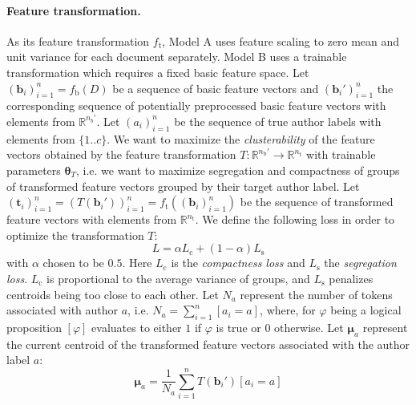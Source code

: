\documentclass[10pt, a4paper]{article}
\newcommand{\vect}[1]{\bm{#1}}
\begin{document}
\paragraph{Feature transformation.}
As its feature transformation $f_\mathrm{t}$, Model A uses feature scaling to zero mean and unit variance for each document separately. Model B uses a trainable transformation which requires a fixed basic feature space. Let $(\vect{b}_i)_{i=1}^n = f_\mathrm{b}(D)$ be a sequence of basic feature vectors and $(\vect{b}_i')_{i=1}^n$ the corresponding sequence of potentially preprocessed basic feature vectors with elements from $\mathbb{R}^{n_{b}'}$. Let $(a_i)_{i=1}^n$ be the sequence of true author labels with elements from $\{1..c\}$. We want to maximize the \emph{clusterability} of the feature vectors obtained by the feature transformation $T:\mathbb{R}^{n_\mathrm{b}'}\rightarrow\mathbb{R}^{n_\mathrm{t}}$ with trainable parameters $\vect{\theta}_T$, i.e. we want to maximize segregation and compactness of groups of transformed feature vectors grouped by their target author label. Let $(\vect{t}_i)_{i=1}^n = (T(\boldsymbol{b}_i'))_{i=1}^n = f_\mathrm{t}((\vect{b}_i)_{i=1}^n)$ be the sequence of transformed feature vectors with elements from $\mathbb{R}^{n_\mathrm{t}}$. We define the following loss in order to optimize the transformation $T$:
\begin{equation}
	L = \alpha L_\mathrm{c} + (1-\alpha)L_\mathrm{s}
\end{equation}
with $\alpha$ chosen to be $0.5$. Here $L_\mathrm{c}$ is the \emph{compactness loss} and $L_\mathrm{s}$ the \emph{segregation loss}. $L_\mathrm{c}$ is proportional to the average variance of groups, and $L_\mathrm{s}$ penalizes centroids being too close to each other. Let $N_a$ represent the number of tokens associated with author $a$, i.e. $N_a = \sum_{i=1}^n[a_i=a]$, where, for $\varphi$ being a logical proposition $[\varphi]$ evaluates to either $1$ if $\varphi$ is true or $0$ otherwise.
Let $\vect{\mu}_a$ represent the current centroid of the transformed feature vectors associated with the author label $a$:
\begin{equation}
\vect{\mu}_a = \frac{1}{N_a}\sum_{i=1}^n T(\vect{b}_i')[a_i=a]
\end{equation}	
\end{document}

